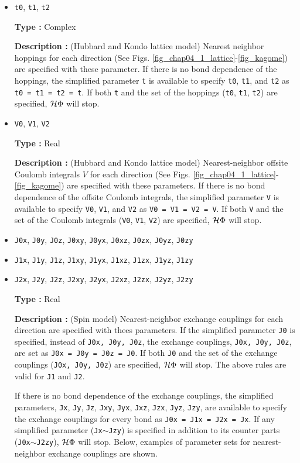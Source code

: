 \begin{itemize}
\item \verb|t0|,  \verb|t1|, \verb|t2|

{\bf Type :} Complex

{\bf Description :} (Hubbard and Kondo lattice model)
Nearest neighbor hoppings for each direction
(See Figs. \ref{fig_chap04_1_lattice}-\ref{fig_kagome})
are specified with these parameter.
If there is no bond dependence of the hoppings,
the simplified parameter \verb|t| is available to specify \verb|t0|,  \verb|t1|, and \verb|t2| as
\verb|t0 = t1 = t2 = t|.
If both \verb|t| and the set of the hoppings (\verb|t0|,  \verb|t1|, \verb|t2|) are specified,
$\mathcal{H} \Phi$ will stop.

\item \verb|V0|,  \verb|V1|, \verb|V2|

{\bf Type :} Real

{\bf Description :} (Hubbard and Kondo lattice model)
Nearest-neighbor offsite Coulomb integrals $V$
 for each direction
(See Figs. \ref{fig_chap04_1_lattice}-\ref{fig_kagome})
are specified with these parameters.
If there is no bond dependence of the offsite Coulomb integrals,
the simplified parameter \verb|V| is available to specify \verb|V0|,  \verb|V1|, and \verb|V2| as
\verb|V0 = V1 = V2 = V|.
If both \verb|V| and the set of the Coulomb integrals (\verb|V0|,  \verb|V1|, \verb|V2|) are specified,
$\mathcal{H} \Phi$ will stop.

\item \verb|J0x|, \verb|J0y|, \verb|J0z|, \verb|J0xy|, 
  \verb|J0yx|, \verb|J0xz|, \verb|J0zx|, \verb|J0yz|, \verb|J0zy|
\item \verb|J1x|, \verb|J1y|, \verb|J1z|, \verb|J1xy|, 
  \verb|J1yx|, \verb|J1xz|, \verb|J1zx|, \verb|J1yz|, \verb|J1zy|
\item \verb|J2x|, \verb|J2y|, \verb|J2z|, \verb|J2xy|, 
  \verb|J2yx|, \verb|J2xz|, \verb|J2zx|, \verb|J2yz|, \verb|J2zy|

{\bf Type :} Real

{\bf Description :} (Spin model)
Nearest-neighbor exchange couplings for each direction
are specified with thees parameters.
If the simplified parameter \verb|J0| is specified, instead of \verb|J0x, J0y, J0z|,
the exchange couplings, \verb|J0x, J0y, J0z|, are set as \verb|J0x = J0y = J0z = J0|.
If both \verb|J0| and the set of the exchange couplings (\verb|J0x, J0y, J0z|)
are specified, $\mathcal{H} \Phi$ will stop.
The above rules are valid for \verb|J1| and \verb|J2|.

If there is no bond dependence of the exchange couplings,
the simplified parameters,
\verb|Jx|, \verb|Jy|, \verb|Jz|, \verb|Jxy|, 
\verb|Jyx|, \verb|Jxz|, \verb|Jzx|, \verb|Jyz|, \verb|Jzy|,
are available to specify the exchange couplings for every bond as
\verb|J0x = J1x = J2x = Jx|.
If any simplified parameter (\verb|Jx|$\sim$\verb|Jzy|)
is specified in addition to its counter parts (\verb|J0x|$\sim$\verb|J2zy|),
$\mathcal{H} \Phi$ will stop.
Below, examples of parameter sets for nearest-neighbor exchange couplings are shown.


\end{itemize}
